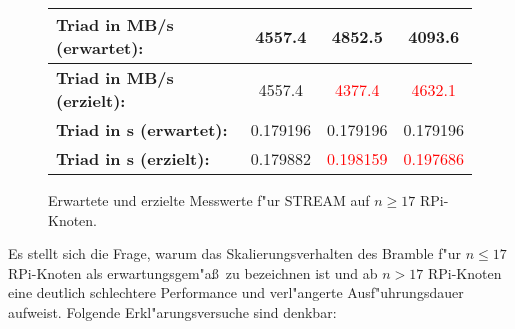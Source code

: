 \begin{figure}
\begin{tabular}{|l|c|c|c|}
    \hline 
    \textbf{Triad in MB/s (erwartet):} & 4557.4 & 4852.5 & 4093.6\\
    \hline 
    \textbf{Triad in MB/s (erzielt):} & 4557.4 & \textcolor{red}{4377.4} & \textcolor{red}{4632.1}\\
    \hline 
    \textbf{Triad in s (erwartet):} & 0.179196 & 0.179196 & 0.179196\\
    \hline 
    \textbf{Triad in s (erzielt):} & 0.179882 & \textcolor{red}{0.198159} & \textcolor{red}{0.197686}\\
    \hline 
  \end{tabular}
  \caption{Erwartete und erzielte Messwerte f"ur STREAM auf $n\geq 17$ RPi-Knoten.}\label{fig:stream-abweichung}
\end{figure}
\noindent
Es stellt sich die Frage, warum das Skalierungsverhalten des Bramble f"ur $n\leq 17$ RPi-Knoten als erwartungsgem"a\ss\ zu bezeichnen ist und ab $n>17$ RPi-Knoten eine deutlich schlechtere Performance und verl"angerte Ausf"uhrungsdauer aufweist. Folgende Erkl"arungsversuche sind denkbar: 
